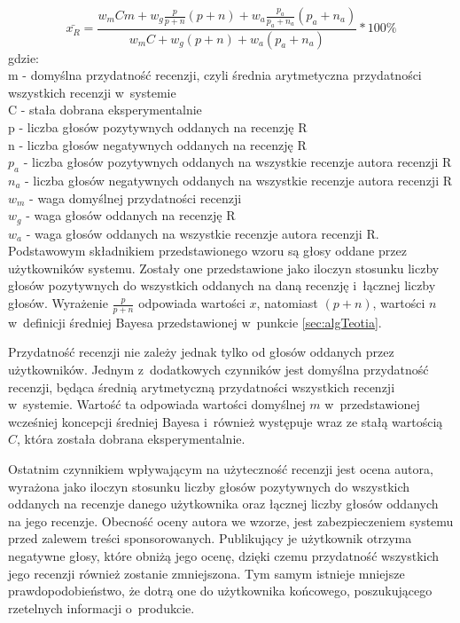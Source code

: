 \begin{equation}
\bar{x_{R}}=\frac{w_{m}Cm+w_{g}\frac{p}{p+n}(p+n)+w_{a}\frac{p_{a}}{p_{a}+n_{a}}(p_{a}+n_{a})}{w_{m}C+w_{g}(p+n)+w_{a}(p_{a}+n_{a})}*100\%
\end{equation}
gdzie:\\
m - domyślna przydatność recenzji, czyli średnia arytmetyczna przydatności wszystkich recenzji w~systemie\\
C - stała dobrana eksperymentalnie\\
p - liczba głosów pozytywnych oddanych na recenzję R\\
n - liczba głosów negatywnych oddanych na recenzję R\\
$p_{a}$ - liczba głosów pozytywnych oddanych na wszystkie recenzje autora recenzji R\\
$n_{a}$ - liczba głosów negatywnych oddanych na wszystkie recenzje autora recenzji R\\
$w_{m}$ - waga domyślnej przydatności recenzji\\
$w_{g}$ - waga głosów oddanych na recenzję R\\
$w_{a}$ - waga głosów oddanych na wszystkie recenzje autora recenzji R.\\


Podstawowym składnikiem przedstawionego wzoru są głosy oddane przez użytkowników systemu. Zostały one przedstawione jako iloczyn stosunku liczby głosów pozytywnych do wszystkich oddanych na daną recenzję i~łącznej liczby głosów. Wyrażenie $\frac{p}{p+n}$ odpowiada wartości $x$, natomiast $(p + n)$, wartości $n$ w~definicji średniej Bayesa przedstawionej w~punkcie \ref{sec:algTeotia}.

Przydatność recenzji nie zależy jednak tylko od głosów oddanych przez użytkowników. Jednym z~dodatkowych czynników jest domyślna przydatność recenzji, będąca średnią arytmetyczną przydatności wszystkich recenzji w~systemie. Wartość ta odpowiada wartości domyślnej $m$ w~przedstawionej wcześniej koncepcji średniej Bayesa i~również występuje wraz ze stałą wartością $C$, która została dobrana eksperymentalnie.

Ostatnim czynnikiem wpływającym na użyteczność recenzji jest ocena autora, wyrażona jako iloczyn stosunku liczby głosów pozytywnych do wszystkich oddanych na recenzje danego użytkownika oraz łącznej liczby głosów oddanych na jego recenzje. Obecność oceny autora we wzorze, jest zabezpieczeniem systemu przed zalewem treści sponsorowanych. Publikujący je użytkownik otrzyma negatywne głosy, które obniżą jego ocenę, dzięki czemu przydatność wszystkich jego recenzji również zostanie zmniejszona. Tym samym istnieje mniejsze prawdopodobieństwo, że dotrą one do użytkownika końcowego, poszukującego rzetelnych informacji o~produkcie. 


